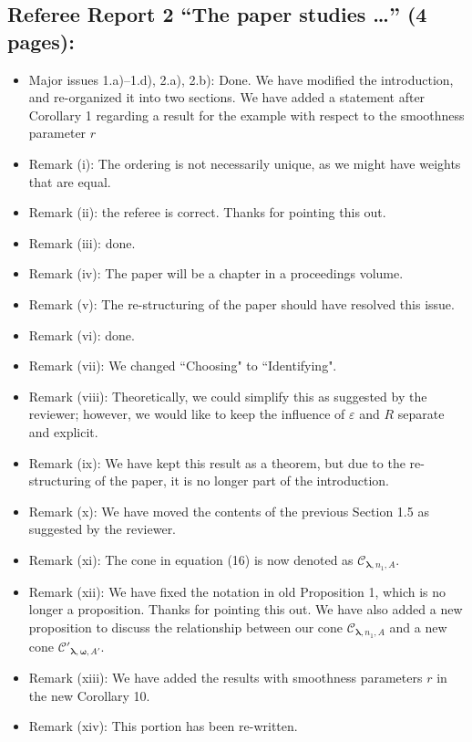 \documentclass[11pt]{article}
\newcommand{\calC}{\mathcal{C}}
\begin{document}
\subsection*{Referee Report 2 ``The paper studies \ldots'' (4 pages):}

\begin{itemize}
\item Major issues 1.a)--1.d), 2.a), 2.b): Done. We have modified the introduction, and re-organized it into two sections. We have added a statement after Corollary 1 regarding a result for the example with respect to the smoothness parameter $r$
\item Remark (i): The ordering is not necessarily unique, as we might have weights 
that are equal. 
\item Remark (ii): the referee is correct. Thanks for pointing this out. 
\item Remark (iii): done. 
\item Remark (iv): The paper will be a chapter in a proceedings volume.
\item Remark (v): The re-structuring of the paper should have resolved this issue.
\item Remark (vi): done. 
\item Remark (vii): We changed ``Choosing" to ``Identifying".
\item Remark (viii): Theoretically, we could simplify this as suggested by the reviewer; however, we would like to keep the influence of $\varepsilon$ and $R$ separate and explicit. 
\item Remark (ix): We have kept this result as a theorem, but due to the re-structuring of the paper, it is no longer part of the introduction. 
\item Remark (x): We have moved the contents of the previous Section 1.5 as suggested by the reviewer. 
\item Remark (xi): The cone in equation (16) is now denoted as $\calC_{\boldsymbol{\lambda},n_1,A}$. 
\item Remark (xii): We have fixed the notation in old Proposition 1, which is no longer a proposition. Thanks for pointing this out. We have also added a new proposition  to discuss the relationship between our cone $\mathcal{C}_{\boldsymbol{\lambda},n_1,A}$ and a new cone $\mathcal{C}'_{\boldsymbol{\lambda},\boldsymbol{\omega},A'}$.
\item Remark (xiii): We have added the results with smoothness parameters $r$ in the new Corollary 10.
\item Remark (xiv): This portion has been re-written. 

\end{itemize}
\end{document}
